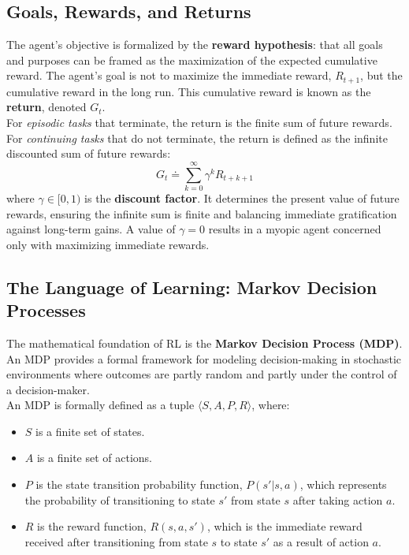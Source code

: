 \subsection{Goals, Rewards, and Returns}
The agent's objective is formalized by the \textbf{reward hypothesis}: that all goals and purposes can be framed as the maximization of the expected cumulative reward. The agent's goal is not to maximize the immediate reward, $R_{t+1}$, but the cumulative reward in the long run. This cumulative reward is known as the \textbf{return}, denoted $G_t$.
\\
\noindent
For \textit{episodic tasks} that terminate, the return is the finite sum of future rewards. For \textit{continuing tasks} that do not terminate, the return is defined as the infinite discounted sum of future rewards:
\begin{equation}
    G_t \doteq \sum_{k=0}^{\infty} \gamma^k R_{t+k+1}
\end{equation}
where $\gamma \in [0, 1)$ is the \textbf{discount factor}. It determines the present value of future rewards, ensuring the infinite sum is finite and balancing immediate gratification against long-term gains. A value of $\gamma=0$ results in a myopic agent concerned only with maximizing immediate rewards.

\subsection{The Language of Learning: Markov Decision Processes}

The mathematical foundation of RL is the \textbf{Markov Decision Process (MDP)}. An MDP provides a formal framework for modeling decision-making in stochastic environments where outcomes are partly random and partly under the control of a decision-maker.
\\
\noindent
An MDP is formally defined as a tuple \( \langle S, A, P, R \rangle \), where:
\begin{itemize}
    \item \(S\) is a finite set of states.
    \item \(A\) is a finite set of actions.
    \item \(P\) is the state transition probability function, \(P(s'|s, a)\), which represents the probability of transitioning to state \(s'\) from state \(s\) after taking action \(a\).
    \item \(R\) is the reward function, \(R(s, a, s')\), which is the immediate reward received after transitioning from state \(s\) to state \(s'\) as a result of action \(a\).
\end{itemize}

